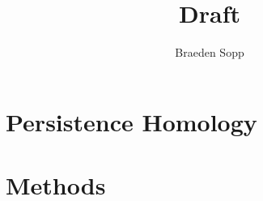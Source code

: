 \documentclass[11pt]{article}
\title{Draft}
\author{Braeden Sopp}
\date{}
\begin{document}
    \maketitle
    
    \section*{Persistence Homology}
    
    \section*{Methods}
    




    
    
\end{document}
